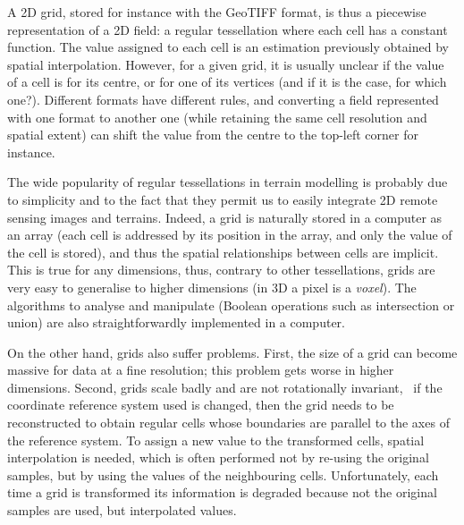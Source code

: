 %

\begin{floatbox}
\begin{kaobox-practice}[frametitle=\faCog\ Concrete example: a 2D grid]
  A 2D grid, stored for instance with the GeoTIFF format, is thus a piecewise representation of a 2D field: a regular tessellation where each cell has a constant function.
  The value assigned to each cell is an estimation previously obtained by spatial interpolation.
  However, for a given grid, it is usually unclear if the value of a cell is for its centre, or for one of its vertices (and if it is the case, for which one?).
  Different formats have different rules, and converting a field represented with one format to another one (while retaining the same cell resolution and spatial extent) can shift the value from the centre to the top-left corner for instance.
\end{kaobox-practice}
\end{floatbox}

%

The wide popularity of regular tessellations in terrain modelling is probably due to simplicity and to the fact that they permit us to easily integrate 2D remote sensing images and terrains.
Indeed, a grid is naturally stored in a computer as an array (each cell is addressed by its position in the array, and only the value of the cell is stored), and thus the spatial relationships between cells are implicit. 
This is true for any dimensions, thus, contrary to other tessellations, grids are very easy to generalise to higher dimensions (in 3D a pixel is a \emph{voxel}).%
The algorithms to analyse and manipulate (Boolean operations such as intersection or union) are also straightforwardly implemented in a computer. 

On the other hand, grids also suffer problems.
First, the size of a grid can become massive for data at a fine resolution; this problem gets worse in higher dimensions.
Second, grids scale badly and are not rotationally invariant, \ie\ if the coordinate reference system used is changed, then the grid needs to be reconstructed to obtain regular cells whose boundaries are parallel to the axes of the reference system.
To assign a new value to the transformed cells, spatial interpolation is needed, which is often performed not by re-using the original samples, but by using the values of the neighbouring cells.
Unfortunately, each time a grid is transformed its information is degraded because not the original samples are used, but interpolated values.



